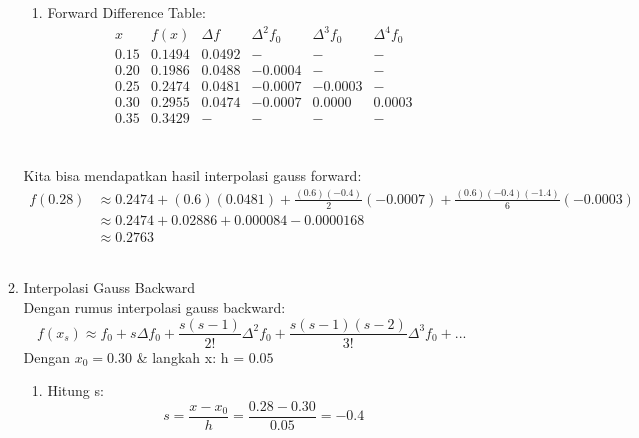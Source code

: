\documentclass{article}
\begin{document}
\begin{enumerate}
\begin{enumerate}
\begin{enumerate}
            \item Forward Difference Table: \\
            \[
            \begin{array}{c|c|c|c|c|c}
                x & f(x) & \Delta f & \Delta ^2f_0 & \Delta ^3f_0 & \Delta ^4f_0 \\
                \hline
                \num{0,15} & \num{0,1494} & \num{0,0492} & - & - & - \\
                \num{0,20} & \num{0,1986} & \num{0,0488} &  -\num{0,0004} & - & - \\
                \num{0,25} & \num{0,2474} & \num{0,0481} &  -\num{0,0007} & -\num{0,0003} & - \\
                \num{0,30} & \num{0,2955} & \num{0,0474} & -\num{0,0007} &  \num{0,0000} & \num{0,0003} \\
                \num{0,35} & \num{0,3429} & - & - & - & - \\
            \end{array}
            \] \\
        \end{enumerate}
        Kita bisa mendapatkan hasil interpolasi gauss forward:
        \begin{align*}
            f(0.28) &\approx 0.2474 + (0.6)(0.0481) + \frac{(0.6)(-0.4)}{2}(-0.0007) + \frac{(0.6)(-0.4)(-1.4)}{6}(-0.0003) \\
            &\approx 0.2474 + 0.02886 + 0.000084 - 0.0000168 \\
            &\approx 0.2763
        \end{align*} \\

        \item Interpolasi Gauss Backward \\
        Dengan rumus interpolasi gauss backward: 
        \[
        f(x_s) \approx f_0 + s\Delta f_0 + \frac{s(s-1)}{2!}\Delta ^2f_0 + \frac{s(s-1)(s-2)}{3!}\Delta ^3f_0 + ...
        \]
        Dengan $x_0 = \num{0,30}$ \& langkah x: h = $\num{0,05}$ 
        \begin{enumerate}
            \item Hitung s: \\
            \[
            s = \frac{x-x_0}{h} = \frac{0.28 - 0.30}{0.05} = -0.4
            \]


\end{enumerate}
\end{enumerate}
\end{enumerate}
\end{document}
